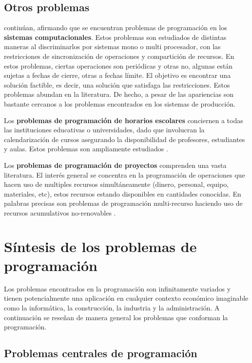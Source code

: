 \documentclass[spanish,draft,12pt,headsepline,footsepline,paper=letter]{scrreprt}
\begin{document}
\subsection{Otros problemas}
\label{otros_problemas}

\citet[p.~7]{TKindt2002} continúan, afirmando que se encuentran problemas de programación en los \textbf{sistemas computacionales}. Estos problemas son estudiados de distintas maneras al discriminarlos por sistemas mono o multi procesador, con las restricciones de sincronización de operaciones y compartición de recursos. En estos problemas, ciertas operaciones son periódicas y otras no, algunas están sujetas a fechas de cierre, otras a fechas límite. El objetivo es encontrar una solución factible, es decir, una solución que satisfaga las restricciones. Estos problemas abundan en la literatura. De hecho, a pesar de las apariencias son bastante cercanos a los problemas encontrados en los sistemas de producción.

Los \textbf{problemas de programación de horarios escolares} conciernen a todas las instituciones educativas o universidades, dado que involucran la calendarización de cursos asegurando la disponibilidad de profesores, estudiantes y aulas. Estos problemas son ampliamente estudiados \citep[p.~7]{TKindt2002}.

Los \textbf{problemas de programación de proyectos} comprenden una vasta literatura. El interés general se concentra en la programación de operaciones que hacen uso de multiples recursos simultáneamente (dinero, personal, equipo, materiales, etc), estos recursos estando disponibles en cantidades conocidas. En palabras precisas son problemas de programación multi-recurso haciendo uso de recursos acumulativos no-renovables \citep[p.~7]{TKindt2002}.

\section{Síntesis de los problemas de programación}
\label{sintesis_problemas_programacion}

Los problemas encontrados en la programación son infinitamente variados y tienen potencialmente una aplicación en cualquier contexto económico imaginable como la informática, la construcción, la industria y la administración. A continuación se reseñan de manera general los problemas que conforman la programación.

\subsection{Problemas centrales de programación}
\label{problemas_centrales_programación}
\end{document}
